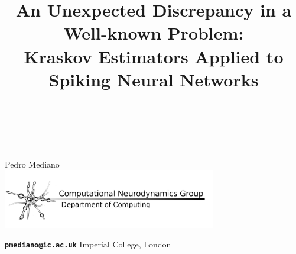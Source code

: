 \documentclass[xcolor=x11names, compress]{beamer}
\renewcommand{\(}{\begin{columns}}
\renewcommand{\)}{\end{columns}}
\newcommand{\<}[1]{\begin{column}{#1}}
\renewcommand{\>}{\end{column}}
\newcommand{\ver}[1]{\texttt{\textbf{#1}}}
\begin{document}
\begin{frame}[plain]
  \title{ {\fontsize{10}{1}\selectfont An Unexpected Discrepancy in a Well-known Problem:} \\ \vspace{3pt} {\fontsize{14}{1}\selectfont \bfseries Kraskov Estimators  Applied to \\ \vspace{-3pt} Spiking Neural Networks} \\ }
\subtitle{ ~ }
\date{}
\vspace{5pt}
\titlepage
\vfill
\begin{center}

% 
% 
% 
% 
% 

  ~ \\
  
  \vfill
  {\large Pedro Mediano}\\ \vspace{-8pt}
  {\includegraphics[width=0.7\textwidth]{logo3.png}}\\ \vspace{-10pt}


\ver{pmediano@ic.ac.uk} \hspace{20pt} Imperial College, London
\end{center}
\end{frame}
\end{document}
